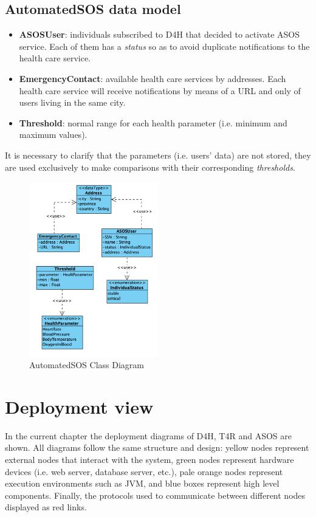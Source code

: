 \documentclass[a4paper, hidelinks, 12pt]{report}
\begin{document}
	\subsection{AutomatedSOS data model}
	\begin{itemize}
		\item{\textbf{ASOSUser}}: individuals subscribed to D4H that decided to activate ASOS service. Each of them has a \textit{status} so as to avoid duplicate notifications to the health care service. 
		\item{\textbf{EmergencyContact}}: available health care services by addresses.  Each health care service will receive notifications by means of a URL and only of users living in the same city.
		\item {\textbf{Threshold}}: normal range for each health parameter (i.e. minimum and maximum values).
	\end{itemize}
	
	It is necessary to clarify that the parameters (i.e. users' data) are not stored, they are used exclusively to make comparisons with their corresponding  \textit{thresholds}. \\
	
	\begin{figure}[H]
    		\centering
		\includegraphics[width=0.5\textwidth]{diagrams/asos_class_diagram.png}
		\caption[AutomatedSOS Class Diagram]{AutomatedSOS Class Diagram}
		\label{fig:AutomatedSOS Class Diagram}
	\end{figure}
			
	\section{Deployment view}
	In the current chapter the deployment diagrams of D4H, T4R and ASOS are shown. All diagrams follow the same structure and design: yellow nodes represent external nodes that interact with the system, green nodes represent hardware devices (i.e. web server, database server, etc.), pale orange nodes represent execution environments such as JVM, and blue boxes represent high level components. Finally, the protocols used to communicate between different nodes displayed as red links.
	
\end{document}

